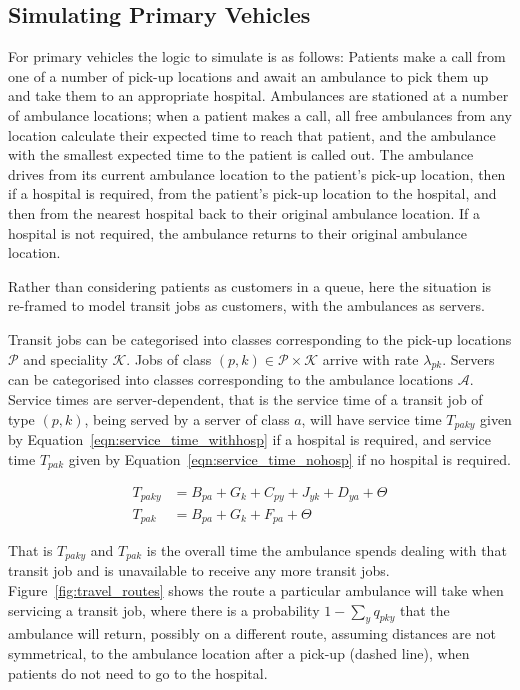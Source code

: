 \documentclass[preprint,12pt]{elsarticle}
\begin{document}
\subsection{Simulating Primary Vehicles}\label{sec:simulation_primary}
For primary vehicles the logic to simulate is as follows: Patients make a call
from one of a number of pick-up locations and await an ambulance to pick them
up and take them to an appropriate hospital. Ambulances are stationed at a
number of ambulance locations; when a patient makes a call, all free
ambulances from any location calculate their expected time to reach that
patient, and the ambulance with the smallest expected time to the patient is
called out. The ambulance drives from its current ambulance location to the
patient's pick-up location, then if a hospital is required, from the patient's
pick-up location to the hospital, and then from the nearest hospital back to
their original ambulance location. If a hospital is not required, the
ambulance returns to their original ambulance location.

Rather than considering patients as customers in a queue, here the situation
is re-framed to model transit jobs as customers, with the ambulances as
servers.

Transit jobs can be categorised into classes corresponding to the pick-up
locations $\mathcal{P}$ and speciality $\mathcal{K}$. Jobs of class
$(p, k) \in \mathcal{P} \times \mathcal{K}$ arrive with rate $\lambda_{pk}$.
Servers can be categorised into classes corresponding to the ambulance
locations $\mathcal{A}$. Service times are server-dependent, that is the
service time of a transit job of type $(p, k)$, being served by a server of
class $a$, will have service time $T_{paky}$ given by
Equation~\ref{eqn:service_time_withhosp} if a hospital is required, and
service time $T_{pak}$ given by Equation~\ref{eqn:service_time_nohosp} if no
hospital is required.

\begin{align}
T_{paky} &= B_{pa} + G_k + C_{py} + J_{yk} + D_{ya} + \Theta \label{eqn:service_time_withhosp} \\
T_{pak} &= B_{pa} + G_k + F_{pa} + \Theta \label{eqn:service_time_nohosp}
\end{align}

That is $T_{paky}$ and $T_{pak}$ is the overall time the ambulance spends
dealing with that transit job and is unavailable to receive any more transit
jobs. Figure~\ref{fig:travel_routes} shows the route a particular ambulance
will take when servicing a transit job, where there is a probability
$1 - \sum_{y} q_{pky}$ that the ambulance will return, possibly on a different
route, assuming distances are not symmetrical, to the ambulance location after
a pick-up (dashed line), when patients do not need to go to the hospital.
\end{document}
